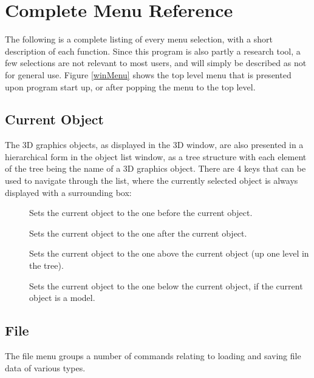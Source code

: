 \documentclass[11pt,letterpaper]{article}
\newcommand{\menu}[1]{{\scriptsize \fbox{\bf #1}}}
\begin{document}
\section{Complete Menu Reference}

The following is a complete listing of every menu selection, with a
short description of each function. Since this program is also partly
a research tool, a few selections are not relevant to most users, and
will simply be described as not for general use. Figure \ref{winMenu}
shows the top level menu that is presented upon program start up, or
after popping the menu to the top level.

\subsection{Current Object}

The 3D graphics objects, as displayed in the 3D window, are also
presented in a hierarchical form in the object list window, as a tree
structure with each element of the tree being the name of a 3D
graphics object. There are 4 keys that can be used to navigate through
the list, where the currently selected object is always displayed with
a surrounding box:

\begin{description}
\item[\menu{Prev}]  Sets the current object to the one before
the current object.
\item[\menu{Next}]  Sets the current object to the one after
the current object.
\item[\menu{Up}]  Sets the current object to the one above
the current object (up one level in the tree).
\item[\menu{Down}]  Sets the current object to the one below
the current object, if the current object is a model.
\end{description}

\subsection{File}

The file menu groups a number of commands relating to loading and saving
file data of various types.
\end{document}
